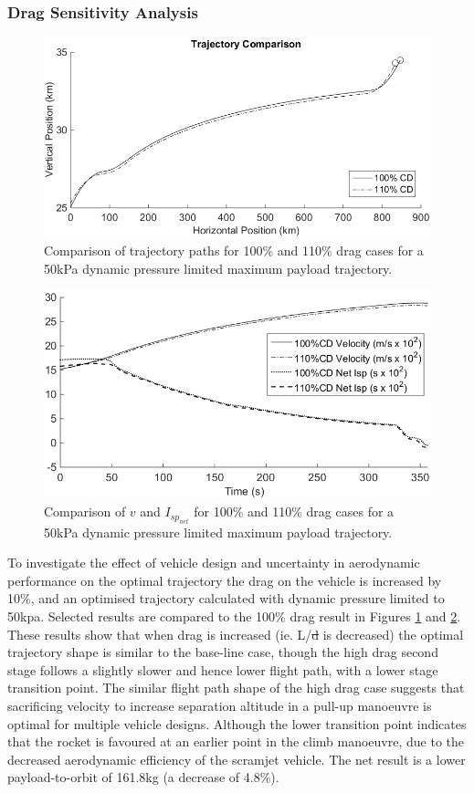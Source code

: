 \documentclass[journal]{new-aiaa}
\newcommand{\PayloadToOrbitHighDrag}{161.8}
\providecommand{\DIFadd}[1]{{\protect\color{blue}\uwave{#1}}} %
\providecommand{\DIFdel}[1]{{\protect\color{red}\sout{#1}}}                      %
\providecommand{\DIFaddbegin}{} %
\providecommand{\DIFaddend}{} %
\providecommand{\DIFdelbegin}{} %
\providecommand{\DIFdelend}{} %
\newcommand{\DIFscaledelfig}{0.5}
\newlength{\DIFdelgraphicswidth} %
\newlength{\DIFdelgraphicsheight} %
\newcommand{\DIFaddincludegraphics}[2][]{{\color{blue}\fbox{\DIFOincludegraphics[#1]{#2}}}} %
\newcommand{\DIFdelincludegraphics}[2][]{%
\sbox{\DIFdelgraphicsbox}{\DIFOincludegraphics[#1]{#2}}%
\settoboxwidth{\DIFdelgraphicswidth}{\DIFdelgraphicsbox} %
\settoboxtotalheight{\DIFdelgraphicsheight}{\DIFdelgraphicsbox} %
\scalebox{\DIFscaledelfig}{%
\parbox[b]{\DIFdelgraphicswidth}{\usebox{\DIFdelgraphicsbox}\\[-\baselineskip] \rule{\DIFdelgraphicswidth}{0em}}\llap{\resizebox{\DIFdelgraphicswidth}{\DIFdelgraphicsheight}{%
\setlength{\unitlength}{\DIFdelgraphicswidth}%
\begin{picture}(1,1)%
\thicklines\linethickness{2pt} %
{\color[rgb]{1,0,0}\put(0,0){\framebox(1,1){}}}%
{\color[rgb]{1,0,0}\put(0,0){\line( 1,1){1}}}%
{\color[rgb]{1,0,0}\put(0,1){\line(1,-1){1}}}%
\end{picture}%
}\hspace*{3pt}}} %
} %
\DeclareRobustCommand{\DIFaddbegin}{\DIFOaddbegin \let\includegraphics\DIFaddincludegraphics} %
\DeclareRobustCommand{\DIFaddend}{\DIFOaddend \let\includegraphics\DIFOincludegraphics} %
\DeclareRobustCommand{\DIFdelbegin}{\DIFOdelbegin \let\includegraphics\DIFdelincludegraphics} %
\DeclareRobustCommand{\DIFdelend}{\DIFOaddend \let\includegraphics\DIFOincludegraphics} %
\begin{document}
\subsubsection{Drag Sensitivity Analysis}\label{subsection:dragvariation}
\begin{figure}[ht]
	\centering
	\includegraphics[width=.7\linewidth]{DragComparisonTraj}
	\caption{Comparison of trajectory paths for 100\% and 110\% drag cases for a 50kPa dynamic pressure limited maximum payload trajectory.}
	\label{fig:DragCompTraj}
\end{figure}

\begin{figure}[ht]
	\centering
	\includegraphics[width=.6\linewidth]{DragComparisonOther}
	\caption{Comparison of $v$ and $I_{sp_{net}}$ for 100\% and 110\% drag cases for a 50kPa dynamic pressure limited maximum payload trajectory.}
	\label{fig:DragCompOther}
\end{figure}

To investigate the effect of vehicle design and uncertainty in aerodynamic performance on the optimal trajectory the drag on the vehicle is increased by 10\%, and an optimised trajectory calculated with dynamic pressure limited to 50kpa. Selected results are compared to the 100\% drag result in Figures \ref{fig:DragCompTraj} and \ref{fig:DragCompOther}. 
These results show that when drag is increased (ie. L/\DIFdelbegin \DIFdel{d }\DIFdelend \DIFaddbegin \DIFadd{\textcolor{red}{D} }\DIFaddend is decreased) the optimal trajectory shape is similar to the base-line case, though the high drag second stage follows a slightly slower and hence lower flight path, with a lower stage transition point. The similar flight path shape of the high drag case suggests that sacrificing velocity to increase separation altitude in a pull-up manoeuvre is optimal for multiple vehicle designs. Although the lower transition point indicates that the rocket is favoured at an earlier point in the climb manoeuvre, due to the decreased aerodynamic efficiency of the scramjet vehicle. 
The net result is  a lower payload-to-orbit of \PayloadToOrbitHighDrag kg (a decrease of 4.8\%). 
\end{document}
